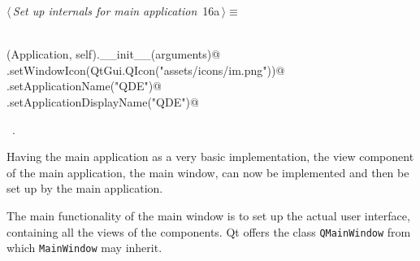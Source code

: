 \documentclass[
    a4paper,      %
    10pt,         %
    openright,    %
    notitlepage,  %
    parskip=half, %
]{scrreprt}       %
\theoremstyle{definition}                    %
\begin{document}
\begin{flushleft} \small
\begin{minipage}{\linewidth}\label{scrap5}\raggedright\small
{} $\langle\,${\itshape Set up internals for main application}\nobreak\ {\footnotesize {16a}}$\,\rangle\equiv$
\vspace{-1ex}
\begin{list}{}{} \item
\mbox{}\lstinline@@\\
\mbox{}\lstinline@super(Application, self).__init__(arguments)@\\
\mbox{}\lstinline@self.setWindowIcon(QtGui.QIcon("assets/icons/im.png"))@\\
\mbox{}\lstinline@self.setApplicationName("QDE")@\\
\mbox{}\lstinline@self.setApplicationDisplayName("QDE")@\\
\mbox{}\lstinline@@{\NWsep}
\end{list}
\vspace{-1.5ex}
\footnotesize
\begin{list}{}{\setlength{\itemsep}{-\parsep}\setlength{\itemindent}{-\leftmargin}}
\item \NWtxtMacroRefIn\ .

\item{}
\end{list}
\end{minipage}\vspace{4ex}
\end{flushleft}
Having the main application as a very basic implementation, the view component
of the main application, the main window, can now be implemented and then be set
up by the main application.

The main functionality of the main window is to set up the actual user
interface, containing all the views of the components. Qt offers the class
\verb+QMainWindow+ from which \verb=MainWindow= may inherit.
\end{document}
